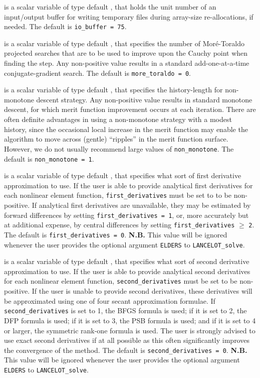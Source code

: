 \documentclass{galahad}
\newcommand{\fullpackagename}{LANC\-E\-LOT}
\newcommand{\solver}{{\tt \fullpackagename\_solve}}
\begin{document}
\begin{description}
 is a scalar variable of type default \integer, that holds
the unit number of an input/output buffer for writing temporary files
during array-size re-allocations, if needed.
The default is {\tt io\_buffer = 75}.

 is a scalar variable of type default \integer, that
specifies the number of Mor\'{e}-Toraldo projected searches
that are to be used to improve upon the Cauchy point when finding the
step. Any non-positive value results in a standard add-one-at-a-time
conjugate-gradient search.
The default is {\tt more\_toraldo = 0}.

 is a scalar variable of type default \integer, that
specifies the history-length for non-monotone descent strategy.
Any non-positive value results in standard monotone descent, for which
merit function improvement occurs at each iteration. There are often
definite advantages in using a non-monotone strategy with a modest history,
since the occasional local increase in the merit function may
enable the algorithm to move across (gentle) ``ripples'' in
the merit function surface.
However, we do not usually recommend large values of {\tt non\_monotone}.
The default is {\tt non\_monotone = 1}.

 is a scalar variable of type default \integer,
that specifies what sort of first derivative
approximation to use. If the user is able to provide
analytical first derivatives for each nonlinear
element function, {\tt first\_derivatives} must be set to
to be non-positive. If analytical first derivatives are unavailable,
they may be estimated by forward differences by setting
{\tt first\_derivatives = 1}, or, more accurately but at additional expense,
by central differences by setting {\tt first\_derivatives} $\geq$ {\tt 2}.
The default is {\tt first\_derivatives = 0}.
{\bf N.B.} This value will be ignored whenever the user provides the
optional argument {\tt ELDERS} to \solver.

 is a scalar variable of type default \integer,
that specifies what sort of second derivative
approximation to use. If the user is able to
provide analytical second derivatives for each nonlinear element function,
{\tt second\_derivatives} must be set to be non-positive. If the
user is unable to provide second derivatives, these
derivatives will be approximated using one of four
secant approximation formulae. If {\tt second\_derivatives} is set to
1, the BFGS formula is used; if it is set to 2, the DFP
formula is used; if it is set to 3, the PSB
formula is used; and if it is set to 4 or larger, the symmetric
rank-one formula is used. The user is strongly advised to
use exact second derivatives
if at all possible as this often
significantly improves the convergence of the method.
The default is {\tt second\_derivatives = 0}.
{\bf N.B.} This value will be ignored whenever the user provides the
optional argument {\tt ELDERS} to \solver.


\end{description}
\end{document}
